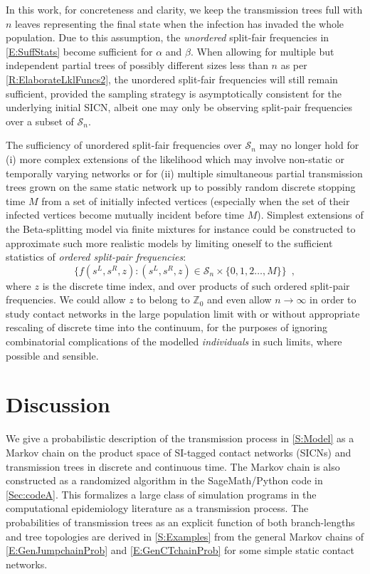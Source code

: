 \documentclass[review]{elsarticle}
\numberwithin{equation}{section}
\let\orgautoref\autoref
\renewcommand{\autoref}
        {\def\equationautorefname{Eq.}%
         \def\figureautorefname{Fig.}%
         \def\subfigureautorefname{Fig.}%
         \def\sectionautorefname{Sect.}%
         \def\subsectionautorefname{Sect.}%
         \def\subsubsectionautorefname{Sect.}%
         \def\Itemautorefname{item}%
         \def\tableautorefname{Table}%
         \def\propositionautorefname{Prop.}%
         \def\corollaryautorefname{Corollary}%
         \def\theoremautorefname{Theorem}%
         \def\remarkautorefname{Remark}%
         \def\lemmaautorefname{Lemma}%
         \def\proofofautorefname{Proof}%
         \def\exampleautorefname{Example}%
         \orgautoref}
\providecommand{\autorefs}
        {\def\equationautorefname{Eqs.}%
         \def\figureautorefname{Figs.}%
         \def\subfigureautorefname{Figs.}%
         \def\sectionautorefname{Sects.}%
         \def\subsectionautorefname{Sects.}%
         \def\subsubsectionautorefname{Sects.}%
         \def\Itemautorefname{items}%
         \def\tableautorefname{Tables}%
         \def\propositionautorefname{Props.}%
         \def\theoremautorefname{Theorems}%
         \def\theoremautorefname{Remarks}%
         \def\lemmaautorefname{Lemmas}%
         \def\proofofautorefname{Proofs}%
         \def\exampleautorefname{Examples}%
         \orgautoref}
\begin{document}
In this work, for concreteness and clarity, we keep the transmission trees full with $n$ leaves representing the final state when the infection has invaded the whole population.  
Due to this assumption, the {\em unordered} split-fair frequencies in \autoref{E:SuffStats} become sufficient for $\alpha$ and $\beta$.  
When allowing for multiple but independent partial trees of possibly different sizes less than $n$ as per \autoref{R:ElaborateLklFuncs2}, the unordered split-fair frequencies will still remain sufficient, provided the sampling strategy is asymptotically consistent for the underlying initial SICN, albeit one may only be observing split-pair frequencies over a subset of $\mathcal{S}_n$.  

The sufficiency of unordered split-fair frequencies over $\mathcal{S}_n$ may no longer hold for (i) more complex extensions of the likelihood which may involve non-static or temporally varying networks or for (ii) multiple simultaneous partial transmission trees grown on the same static network up to possibly random discrete stopping time $M$ from a set of initially infected vertices (especially when the set of their infected vertices become mutually incident before time $M$).  
Simplest extensions of the Beta-splitting model via finite mixtures for instance could be constructed to approximate such more realistic models by limiting oneself to the sufficient statistics of {\em ordered split-pair frequencies}:
\begin{equation}\label{E:OrderedSplitPairFrequencies}
\{ f(s^L,s^R,z) : (s^L,s^R,z) \in \mathcal{S}_n \times \{0,1,2\ldots,M\} \} \enspace,
\end{equation}
where $z$ is the discrete time index, and over products of such ordered split-pair frequencies.  
We could allow $z$ to belong to $\mathbb{Z}_0$ and even allow $n \to \infty$ in order to study contact networks in the large population limit with or without appropriate rescaling of discrete time into the continuum, for the purposes of ignoring combinatorial complications of the modelled {\em individuals} in such limits, where possible and sensible.

\section{Discussion}\label{S:Discussion}

We give a probabilistic description of the transmission process in \autoref{S:Model} as a Markov chain on the product space of SI-tagged contact networks (SICNs) and transmission trees in discrete and continuous time.  
The Markov chain is also constructed as a randomized algorithm in the SageMath/Python code in \autoref{Sec:codeA}.  
This formalizes a large class of simulation programs in the computational epidemiology literature as a transmission process.  
The probabilities of transmission trees as an explicit function of both branch-lengths and tree topologies are derived in \autoref{S:Examples} from the general Markov chains of \autorefs{E:GenJumpchainProb} and \ref{E:GenCTchainProb} for some simple static contact networks.  
\end{document}

